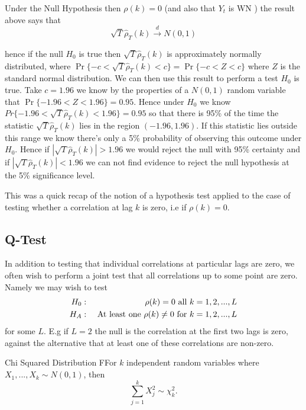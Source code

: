 \documentclass[openany]{tufte-book} %
\begin{document}
Under the Null Hypothesis then $\rho(k)=0$  (and also that $Y_t$ is WN ) the result above says that
\begin{equation}
\sqrt{T}\hat{\rho}_T(k)\overset{d}{\rightarrow}N\left( 0,1\right)  \label{autocorr distn}
\end{equation}

hence if the null $H_0$ is true then $\sqrt{T}\hat{\rho}_T(k)$ is approximately normally distributed, where $\Pr\{-c<\sqrt{T}\hat{\rho}_T(k)<c\}=\Pr\{-c<Z<c\}$ where $Z$ is the standard normal distribution. We can then use this result to perform a test $H_0$ is true. Take $c=1.96$ we know by the properties of a $N(0,1)$ random variable that
$\Pr\{-1.96<Z< 1.96\}=0.95$. Hence under $H_0$  we know $ Pr\{-1.96<\sqrt{T}\hat{\rho}_T(k)<1.96\}=0.95$ so that there is 95\% of the time the statistic $\sqrt{T}\hat{\rho}_T(k)$ lies in the region $(-1.96, 1.96)$. If this statistic lies outside this range we know there's only a 5\% probability of observing this outcome under $H_0$. Hence if $|\sqrt{T}\hat{\rho}_T(k)|>1.96$ we would reject the null with 95\% certainty and if $|\sqrt{T}\hat{\rho}_T(k)|<1.96$ we can not find evidence to reject the null hypothesis at the 5\% significance level.

This was a quick recap of the notion of a hypothesis test applied to the case of testing whether a correlation at lag $k$ is zero, i.e if $\rho(k)=0$.
\subsection{Q-Test}
In addition to testing that individual correlations at particular lags are zero, we often wish to perform a joint test that all correlations up to some point are zero. Namely we may wish to test
\begin{eqnarray}\label{Q}
H_{0} &:&\rho(k)=0\text{ all }k=1,2,...,L  \label{H0-white noise} \\
H_{A} &:&\text{ At least one }\rho(k) \neq 0\text{ for }k=1,2,...,L  \notag
\end{eqnarray}
for some $L$. E.g if $L=2$ the null is the correlation at the first two lags is zero, against the alternative that at least one of these correlations are non-zero.\\

\begin{mydef}{Chi Squared Distribution}
FFor  $k$ independent random variables where $
X_{1},...,X_{k}\sim N(0,1)$, then
\begin{equation*}
\sum_{j=1}^{k}X_{j}^{2}\sim \chi _{k}^{2}.
\end{equation*} \end{mydef}
\end{document}
